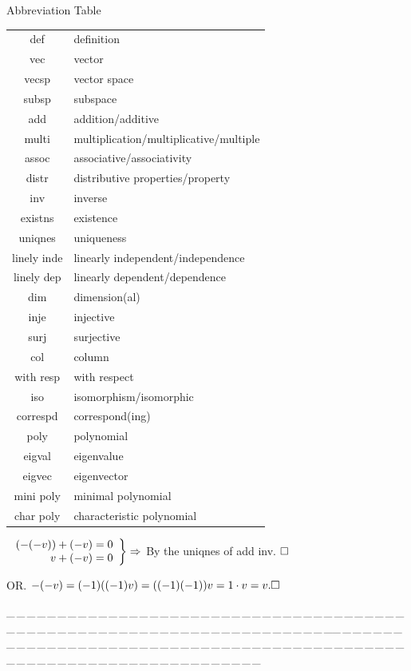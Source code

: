 \documentclass[a4paper, 11pt, UTF8]{article}
\def\Or{\large O{\footnotesize R.} }
\def\ProblemEnding{{\tiny \_\,\_\,\_\,\_\,\_\,\_\,\_\,\_\,\_\,\_\,\_\,\_\,\_\,\_\,\_\,\_\,\_\,\_\,\_\,\_\,\_\,\_\,\_\,\_\,\_\,\_\,\_\,\_\,\_\,\_\,\_\,\_\,\_\,\_\,\_\,\_\,\_\,\_\,\_\,\_\,\_\,\_\,\_\,\_\,\_\,\_\,\_\,\_\,\_\,\_\,\_\,\_\,\_\,\_\,\_\,\_\,\_\,\_\,\_\,\_\,\_\,\_\,\_\,\_\,\_\,\_\,\_\,\_\,\_\,\_\,\_\_\,\_\,\_\,\_\,\_\,\_\,\_\,\_\,\_\,\_\,\_\,\_\,\_\,\_\,\_\,\_\,\_\,\_\,\_\,\_\,\_\,\_\,\_\,\_\,\_\,\_\,\_\,\_\,\_\,\_\,\_\,\_\,\_\,\_\,\_\,\_\,\_\,\_\,\_\,\_\,\_\,\_\,\_\,\_\,\_\,\_\,\_\,\_\,\_\,\_\,\_\,\_\,\_\,\_\,\_\,\_\,\_\,\_\,\_\,\_\,\_\,\_\,\_\,\_\,\_\,\_\,\_\,\_\,\_\,\_\,\_}}
\begin{document}
\begin{large}
\begin{center}
\vspace{20pt}
Abbreviation Table\vspace{8pt}\par
\begin{tabularx}{0.55\textwidth} { 
		| c |
		| >{\raggedright\arraybackslash}X| }
	\hline
def&			definition\\
vec&			vector\\
vecsp&			vector space\\
subsp&			subspace\\
add&			addition/additive\\
multi&			multiplication/multiplicative/multiple\\
assoc&			associative/associativity\\
distr&			distributive properties/property\\
inv&			inverse\\
existns&		existence\\
uniqnes&		uniqueness\\
linely inde&	linearly independent/independence\\
linely dep&		linearly dependent/dependence\\
dim&			dimension(al)\\
inje&			injective\\
surj&			surjective\\
col&			column\\
with resp&		with respect\\
iso&			isomorphism/isomorphic\\
correspd&		correspond(ing)\\
poly&			polynomial\\
eigval&			eigenvalue\\
eigvec&			eigenvector\\
mini poly&		minimal polynomial\\
char poly&		characteristic polynomial\\\hline
\end{tabularx}
\end{center}

\clearpage


\hspace{-6pt}$\MathRightBrace{r}{\,(-(-v))+(-v)=0\\$ $v+(-v)=0}\Rightarrow$ By the uniqnes of add inv. $\hfill\square$\par\vspace{6pt}\qquad\qquad\quad
\Or $-(-v)=(-1)((-1)v)=((-1)(-1))v=1\cdot v=v.\hfill\square$\par
\ProblemEnding\par


\end{large}
\end{document}
